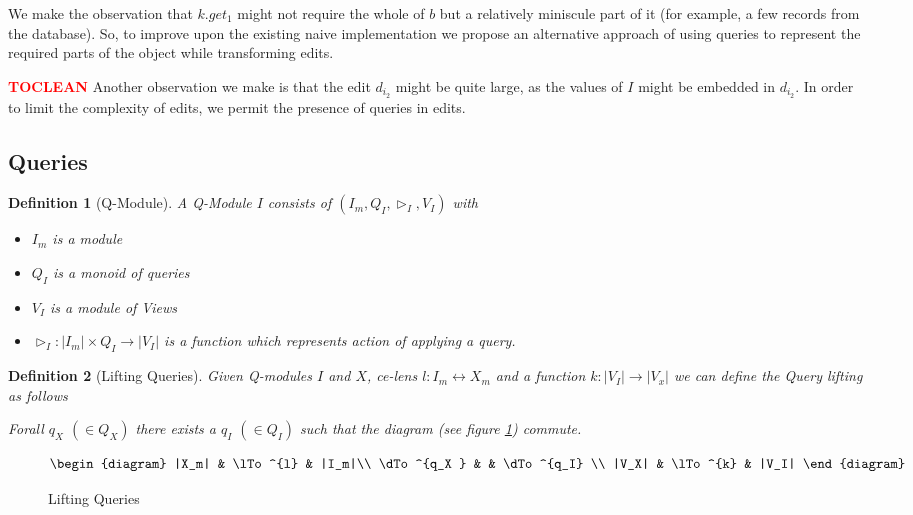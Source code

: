 \documentclass[a4paper,10pt]{article}
\newtheorem{definition}{Definition}
\newcommand{\finish}[1]{#1}
\newcommand{\comment}[1]{\finish{\textbf{\textcolor{red}{#1}}}}
\begin{document}
We make the observation that $k.get_1$
might not require the whole of $b$ but a relatively miniscule
 part of it (for example, a few records from the
database). So, to improve upon the existing naive implementation we
propose an alternative approach of using queries to represent the
required parts of the object while transforming edits. 

\comment{TOCLEAN}
Another observation we make is that the edit $d_{i_2}$ might be quite large, as
the values of $I$ might be embedded in $d_{i_2}$. In order to limit the complexity
of edits, we permit the presence of queries in edits.

\subsection{Queries}
\begin{definition}[Q-Module] A Q-Module $I$ consists of $(I_m,Q_I,\rhd_{I},V_I)$ with
\begin{itemize}
\item $I_m$ is a module
\item $Q_I$ is a monoid of queries
\item $V_I$ is a module of Views
\item $\rhd_{I} : |I_m| \times Q_I \to |V_I|$ is a function which represents action of applying a query.
\end{itemize}
\end{definition} 

\begin{definition}[Lifting Queries]
Given Q-modules $I$ and $X$, ce-lens $l : I_m \leftrightarrow X_m$ and a function $k : |V_I| \rightarrow |V_x|$ we can define the Query lifting as follows

Forall $q_X$ $(\in Q_X)$ there exists a $q_I$ $(\in Q_I)$ such that the diagram (see figure \ref{fig:lifting-queries}) commute. 
\end{definition}

\begin{figure}[ht]
\begin{displaymath}
\begin{diagram}
|X_m| & \lTo^{l} & |I_m|\\
\dTo^{q_X } & & \dTo^{q_I} \\
|V_X| & \lTo^{k} & |V_I| 
\end{diagram}
\end{displaymath}
\caption{Lifting Queries}
\label{fig:lifting-queries}
\end{figure}
\end{document}
